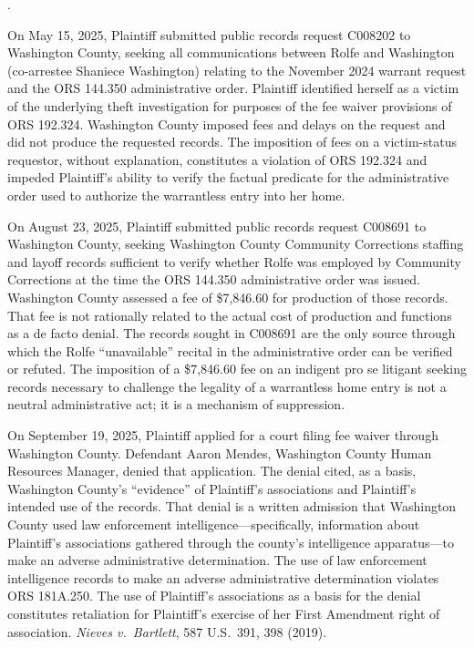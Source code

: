 \documentclass[12pt,letterpaper]{article}
\newcounter{complaintpara}
\newenvironment{paras}{%
	\begin{list}{\arabic{complaintpara}.}{%
			\setlength{\leftmargin}{0.5in}%
			\setlength{\labelwidth}{0.4in}%
			\setlength{\labelsep}{0.1in}%
			\setlength{\itemsep}{0pt}%
			\setlength{\parsep}{0pt}%
			\setlength{\topsep}{6pt}%
		}%
	}{%
	\end{list}%
}
\begin{document}
	\begin{paras}
		
		\item\label{fact:c008202} On May 15, 2025, Plaintiff submitted
		public records request C008202 to Washington County, seeking
		all communications between Rolfe and Washington (co-arrestee
		Shaniece Washington) relating to the November 2024 warrant
		request and the ORS 144.350 administrative order. Plaintiff
		identified herself as a victim of the underlying theft
		investigation for purposes of the fee waiver provisions of
		ORS 192.324. Washington County imposed fees and delays on the
		request and did not produce the requested records. The
		imposition of fees on a victim-status requestor, without
		explanation, constitutes a violation of ORS 192.324 and
		impeded Plaintiff's ability to verify the factual predicate for
		the administrative order used to authorize the warrantless
		entry into her home.
		
		\item\label{fact:c008691} On August 23, 2025, Plaintiff submitted
		public records request C008691 to Washington County, seeking
		Washington County Community Corrections staffing and layoff
		records sufficient to verify whether Rolfe was employed by
		Community Corrections at the time the ORS 144.350
		administrative order was issued. Washington County assessed a
		fee of \$7,846.60 for production of those records. That fee is
		not rationally related to the actual cost of production and
		functions as a de facto denial. The records sought in C008691
		are the only source through which the Rolfe ``unavailable''
		recital in the administrative order can be verified or
		refuted. The imposition of a \$7,846.60 fee on an indigent
		pro se litigant seeking records necessary to challenge the
		legality of a warrantless home entry is not a neutral
		administrative act; it is a mechanism of suppression.
		
		\item\label{fact:mendes} On September 19, 2025, Plaintiff applied
		for a court filing fee waiver through Washington County.
		Defendant Aaron Mendes, Washington County Human Resources
		Manager, denied that application. The denial cited, as a
		basis, Washington County's ``evidence'' of Plaintiff's
		associations and Plaintiff's intended use of the records.
		That denial is a written admission that Washington County used
		law enforcement intelligence---specifically, information about
		Plaintiff's associations gathered through the county's
		intelligence apparatus---to make an adverse administrative
		determination. The use of law enforcement intelligence records
		to make an adverse administrative determination violates
		ORS 181A.250. The use of Plaintiff's associations as a basis
		for the denial constitutes retaliation for Plaintiff's exercise
		of her First Amendment right of association.
		\textit{Nieves v.\ Bartlett}, 587 U.S.\ 391, 398 (2019).
		

\end{paras}
\end{document}
